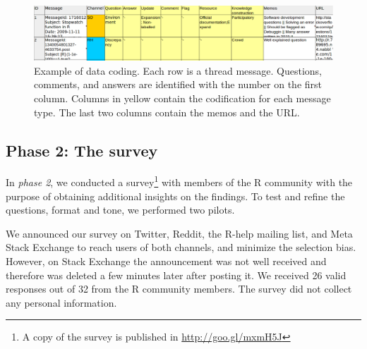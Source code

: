 \documentclass{sig-alternate-05-2015}
\begin{document}

	 	\begin{figure}[!htb]
			\centering
			\includegraphics[width=\textwidth]{Figures/CodingExample}
			\caption{Example of data coding. Each row is a thread message. Questions, comments, and answers are identified with the number on the first column. Columns in yellow contain the codification for each message type. The last two columns contain the memos and the URL.}
			\label{fig:CodingExample}
		\end{figure}

\subsection{Phase 2: The survey} 

In \textit{phase 2}, we conducted a survey\footnote{A copy of the survey is published in \url{http://goo.gl/mxmH5J}} with members of the R community with the purpose of obtaining additional insights on the findings.
To test and refine the questions, format and tone, we performed two pilots.

We announced our survey on Twitter, Reddit, the R-help mailing list, and Meta Stack Exchange to reach users of both channels, and minimize the selection bias.
However, on Stack Exchange the announcement was not well received and therefore was deleted a few minutes later after posting it.
We received 26 valid responses out of 32 from the R community members.
The survey did not collect any personal information.
\end{document}
